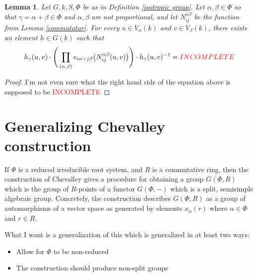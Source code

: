 \documentclass[12pt]{article}
\newtheorem{lemma}{Lemma}
\theoremstyle{definition}
\newcommand{\incomplete}{\textcolor{red}{INCOMPLETE}}
\newcommand{\inv}{^{-1}}
\begin{document}
\begin{lemma}
Let $G, k, S, \Phi$ be as in Definition \ref{isotropic group}. Let $\alpha, \beta \in \Phi$ so that $\gamma = \alpha + \beta \in \Phi$ and $\alpha, \beta$ are not proportional, and let $N_{ij}^{\alpha \beta}$ be the function from Lemma \ref{commutator}. For every $u \in V_\alpha(k)$ and $v \in V_\beta(k)$, there exists an element $h \in G(k)$ such that
\[
	h_\gamma(u,v) \cdot \Bigg( \prod_{(\alpha,\beta)} e_{i\alpha+j\beta} \big(N_{ij}^{\alpha \beta}(u,v) \big) \Bigg) \cdot h_\gamma(u,v) \inv = \incomplete
\]
\end{lemma}
\begin{proof}
I'm not even sure what the right hand side of the equation above is supposed to be  \incomplete
\end{proof}

\newpage
\section{Generalizing Chevalley construction}

If $\Phi$ is a reduced irreducible root system, and $R$ is a commutative ring, then the construction of Chevalley gives a procedure for obtaining a group $G(\Phi, R)$ which is the group of $R$-points of a functor $G(\Phi,-)$ which is a split, semisimple algebraic group. Concretely, the construction describes $G(\Phi, R)$ as a group of automorphisms of a vector space as generated by elements $x_\alpha(r)$ where $\alpha \in \Phi$ and $r \in R$.

What I want is a generalization of this which is generalized in at least two ways:
\begin{itemize}
	\item Allow for $\Phi$ to be non-reduced
	\item The construction should produce non-split groups
\end{itemize}
\end{document}
